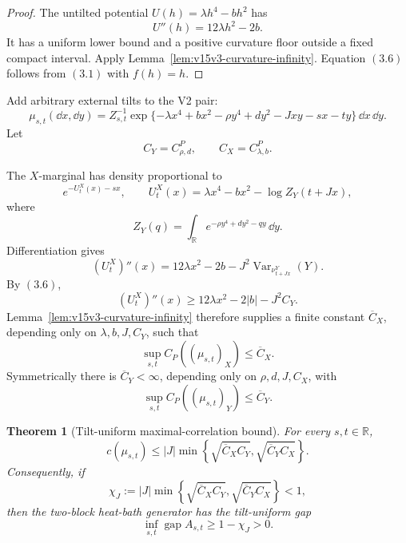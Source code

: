 \documentclass[11pt]{article}
\newtheorem{theorem}{Theorem}[section]
\theoremstyle{remark}
\begin{document}
\begin{proof}
The untilted potential
\(U(h)=\lambda h^4-bh^2\) has
\[
 U''(h)=12\lambda h^2-2b.
\]
It has a uniform lower bound and a positive curvature floor
outside a fixed compact interval.  Apply
Lemma~\ref{lem:v15v3-curvature-infinity}.  Equation \((3.6)\)
follows from \((3.1)\) with \(f(h)=h\).
\end{proof}

Add arbitrary external tilts to the V2 pair:
\[
 \mu_{s,t}(\dd x,\dd y)
 =Z_{s,t}^{-1}\exp\{
 -\lambda x^4+bx^2-\rho y^4+dy^2
 -Jxy-sx-ty
 \}\,\dd x\,\dd y.                                           \tag{3.7}
\]
Let
\[
 C_Y=C_{\rho,d}^{P},\qquad C_X=C_{\lambda,b}^{P}.             \tag{3.8}
\]

The \(X\)-marginal has density proportional to
\[
 e^{-U_t^{X}(x)-sx},\qquad
 U_t^{X}(x)
 =\lambda x^4-bx^2-\log Z_Y(t+Jx),                            \tag{3.9}
\]
where
\[
 Z_Y(q)=\int_{\mathbb R}
 e^{-\rho y^4+dy^2-qy}\,\dd y.
\]
Differentiation gives
\[
 (U_t^{X})''(x)
 =12\lambda x^2-2b
 -J^2\operatorname{Var}_{\nu^{Y}_{t+Jx}}(Y).                 \tag{3.10}
\]
By \((3.6)\),
\[
 (U_t^{X})''(x)
 \ge12\lambda x^2-2|b|-J^2C_Y.                               \tag{3.11}
\]
Lemma~\ref{lem:v15v3-curvature-infinity} therefore supplies a
finite constant \(\overline C_X\), depending only on
\(\lambda,b,J,C_Y\), such that
\[
 \sup_{s,t}C_P((\mu_{s,t})_X)\le\overline C_X.                \tag{3.12}
\]
Symmetrically there is \(\overline C_Y<\infty\), depending only
on \(\rho,d,J,C_X\), with
\[
 \sup_{s,t}C_P((\mu_{s,t})_Y)\le\overline C_Y.                \tag{3.13}
\]

\begin{theorem}[Tilt-uniform maximal-correlation bound]
\label{thm:v15v3-uniform-correlation}
For every \(s,t\in\mathbb R\),
\[
 \boxed{
 c(\mu_{s,t})
 \le |J|\min\left\{
 \sqrt{\overline C_XC_Y},
 \sqrt{\overline C_YC_X}
 \right\}.}                                                  \tag{3.14}
\]
Consequently, if
\[
 \chi_J:=
 |J|\min\left\{
 \sqrt{\overline C_XC_Y},
 \sqrt{\overline C_YC_X}
 \right\}<1,                                                 \tag{3.15}
\]
then the two-block heat-bath generator has the tilt-uniform gap
\[
 \boxed{\inf_{s,t}
 \operatorname{gap}A_{s,t}\ge1-\chi_J>0.}                    \tag{3.16}
\]
\end{theorem}
\end{document}
